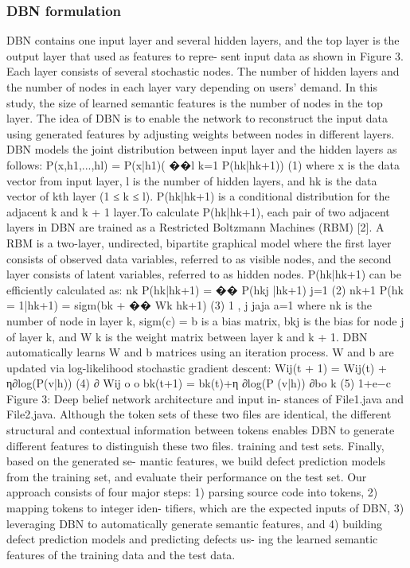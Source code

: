 \documentclass{article}
\begin{document}
\subsubsection{DBN formulation}
DBN contains one input layer and several hidden layers, and the top layer is the output layer that used as features to repre- sent input data as shown in Figure 3. Each layer consists of several stochastic nodes. The number of hidden layers and the number of nodes in each layer vary depending on users’ demand. In this study, the size of learned semantic features is the number of nodes in the top layer. The idea of DBN is to enable the network to reconstruct the input data using generated features by adjusting weights between nodes in different layers.
DBN models the joint distribution between input layer and the hidden layers as follows:
P(x,h1,...,hl) = P(x|h1)(
��l k=1
P(hk|hk+1)) (1)
where x is the data vector from input layer, l is the number of hidden layers, and hk is the data vector of kth layer (1 ≤ k ≤ l). P(hk|hk+1) is a conditional distribution for the adjacent k and k + 1 layer.To calculate P(hk|hk+1), each pair of two adjacent layers in DBN are trained as a Restricted Boltzmann Machines (RBM) [2]. A RBM is a two-layer, undirected, bipartite graphical model where the first layer consists of observed data variables, referred to as visible nodes, and the second layer consists of latent variables, referred to as hidden nodes. P(hk|hk+1) can be efficiently calculated as:
nk
P(hk|hk+1) = �� P(hkj |hk+1)
j=1
(2)
nk+1
P(hk = 1|hk+1) = sigm(bk + �� Wk hk+1)
(3) 1 ,
j jaja a=1
where nk is the number of node in layer k, sigm(c) =
b is a bias matrix, bkj is the bias for node j of layer k, and W k is the weight matrix between layer k and k + 1.
DBN automatically learns W and b matrices using an iteration process. W and b are updated via log-likelihood stochastic gradient descent:
Wij(t + 1) = Wij(t) + η∂log(P(v|h)) (4) ∂ Wij
o o bk(t+1) = bk(t)+η
∂log(P (v|h)) ∂bo
k
(5)
1+e−c
Figure 3: Deep belief network architecture and input in- stances of File1.java and File2.java. Although the token sets of these two files are identical, the different structural and contextual information between tokens enables DBN to generate different features to distinguish these two files.
training and test sets. Finally, based on the generated se- mantic features, we build defect prediction models from the training set, and evaluate their performance on the test set.
Our approach consists of four major steps: 1) parsing source code into tokens, 2) mapping tokens to integer iden- tifiers, which are the expected inputs of DBN, 3) leveraging DBN to automatically generate semantic features, and 4) building defect prediction models and predicting defects us- ing the learned semantic features of the training data and the test data.
\end{document}
